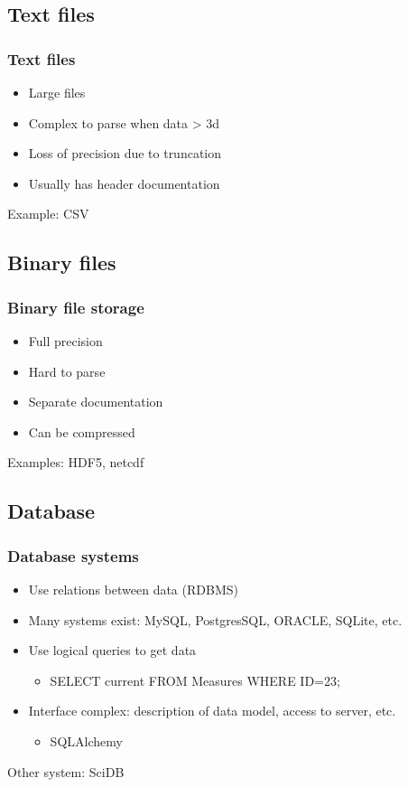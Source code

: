 \documentclass[14pt]{beamer}
\begin{document}
\subsection{Text files}
\begin{frame}
\frametitle{Text files}
\begin{itemize}
\item Large files
\item Complex to parse when data > 3d
\item Loss of precision due to truncation
\item Usually has header documentation 
\end{itemize}
Example: CSV
\end{frame}

\subsection{Binary files}
\begin{frame}
\frametitle{Binary file storage}
\begin{itemize}
\item Full precision
\item Hard to parse
\item Separate documentation
\item Can be compressed
\end{itemize}
Examples: HDF5, netcdf
\end{frame}

\subsection{Database}
\begin{frame}
\frametitle{Database systems}
\begin{itemize}
\item Use relations between data (RDBMS)
\item Many systems exist: MySQL, PostgresSQL, ORACLE, SQLite, etc.
\item Use logical queries to get data
\begin{itemize}
\item SELECT current FROM Measures WHERE ID=23;
\end{itemize}
\item Interface complex: description of data model, access to server, etc.
\begin{itemize}
\item SQLAlchemy
\end{itemize}
\end{itemize}
Other system: SciDB
\end{frame}
\end{document}
